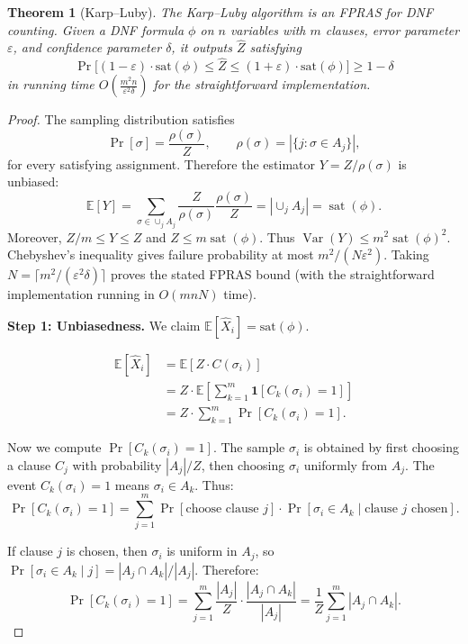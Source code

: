 \documentclass[twoside,12pt]{book}
\theoremstyle{plain}
\newtheorem{theorem}{Theorem}[chapter]
\theoremstyle{definition}
\theoremstyle{remark}
\begin{document}
\begin{theorem}[Karp--Luby]
\label{thm:karpluby}
The Karp--Luby algorithm is an FPRAS for DNF counting. Given a DNF formula $\phi$ on $n$ variables with $m$ clauses, error parameter $\varepsilon$, and confidence parameter $\delta$, it outputs $\hat{Z}$ satisfying
\[
\Pr\!\bigl[(1 - \varepsilon) \cdot \text{sat}(\phi) \leq \hat{Z} \leq (1 + \varepsilon) \cdot \text{sat}(\phi)\bigr] \geq 1 - \delta
\]
in running time $O\!\left(\frac{m^2 n}{\varepsilon^2\delta}\right)$ for the
straightforward implementation.
\end{theorem}

\begin{proof}
The sampling distribution satisfies
\[
 \Pr[\sigma]=\frac{\rho(\sigma)}{Z},
 \qquad \rho(\sigma)=|\{j:\sigma\in A_j\}|,
\]
for every satisfying assignment.  Therefore the estimator
$Y=Z/\rho(\sigma)$ is unbiased:
\[
 \mathbb{E}[Y]=\sum_{\sigma\in\cup_j A_j}
 \frac{Z}{\rho(\sigma)}\frac{\rho(\sigma)}{Z}
 =|\cup_j A_j|=\operatorname{sat}(\phi).
\]
Moreover, $Z/m\leq Y\leq Z$ and $Z\leq m\operatorname{sat}(\phi)$.
Thus $\operatorname{Var}(Y)\leq m^2\operatorname{sat}(\phi)^2$.
Chebyshev's inequality gives failure probability at most
$m^2/(N\varepsilon^2)$.  Taking
$N=\lceil m^2/(\varepsilon^2\delta)\rceil$ proves the stated FPRAS
bound (with the straightforward implementation running in
$O(mnN)$ time).

\iffalse

\textbf{Step 1: Unbiasedness.} We claim $\mathbb{E}[\hat{X}_i] = \text{sat}(\phi)$.

\begin{align*}
\mathbb{E}[\hat{X}_i]
&= \mathbb{E}[Z \cdot C(\sigma_i)] \\
&= Z \cdot \mathbb{E}\!\left[ \sum_{k=1}^m \mathbf{1}[C_k(\sigma_i) = 1] \right] \\
&= Z \cdot \sum_{k=1}^m \Pr[C_k(\sigma_i) = 1].
\end{align*}

Now we compute $\Pr[C_k(\sigma_i) = 1]$. The sample $\sigma_i$ is obtained by first choosing a clause $C_j$ with probability $|A_j|/Z$, then choosing $\sigma_i$ uniformly from $A_j$. The event $C_k(\sigma_i) = 1$ means $\sigma_i \in A_k$. Thus:
\[
\Pr[C_k(\sigma_i) = 1] = \sum_{j=1}^m \Pr[\text{choose clause } j] \cdot \Pr[\sigma_i \in A_k \mid \text{clause } j \text{ chosen}].
\]

If clause $j$ is chosen, then $\sigma_i$ is uniform in $A_j$, so $\Pr[\sigma_i \in A_k \mid j] = |A_j \cap A_k| / |A_j|$. Therefore:
\[
\Pr[C_k(\sigma_i) = 1] = \sum_{j=1}^m \frac{|A_j|}{Z} \cdot \frac{|A_j \cap A_k|}{|A_j|} = \frac{1}{Z} \sum_{j=1}^m |A_j \cap A_k|.
\]


\end{proof}
\end{document}
